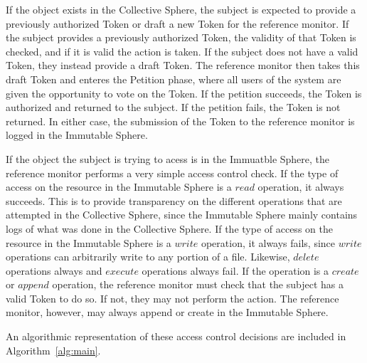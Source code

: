 If the object exists in the Collective Sphere, the subject is expected to
provide a previously authorized Token or draft a new Token for the reference
monitor. If the subject provides a previously authorized Token, the validity of
that Token is checked, and if it is valid the action is taken. If
the subject does not have a valid Token, they instead provide a draft Token. The
reference monitor then takes this draft Token and enteres the Petition phase,
where all users of the system are given the opportunity to vote on the Token. If
the petition succeeds, the Token is authorized and returned to the subject. If
the petition fails, the Token is not returned. In either case, the submission of
the Token to the reference monitor is logged in the Immutable Sphere.

If the object the subject is trying to acess is in the Immuatble Sphere, the
reference monitor performs a very simple access control check. If the type of
access on the resource in the Immutable Sphere is a $read$ operation, it always
succeeds. This
is to provide transparency on the different operations that are attempted in
the Collective Sphere, since the Immutable Sphere mainly contains logs of what
was done in the Collective Sphere. If the type of access on the resource in the
Immutable Sphere is a $write$ operation, it always fails, since $write$
operations can arbitrarily write to any portion of a file. Likewise, $delete$
operations always and $execute$ operations always fail. If the operation is a
$create$ or $append$ operation, the reference monitor must check that the
subject has a valid Token to do so. If not, they may not perform the action.
The reference monitor, however, may always append or create in the Immutable
Sphere.

An algorithmic representation of these access control decisions are included in
Algorithm~\ref{alg:main}.

